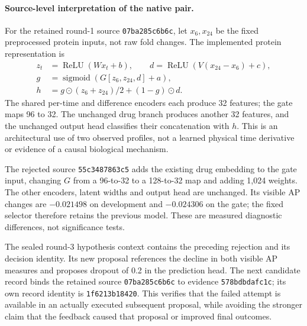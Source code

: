 \paragraph{Source-level interpretation of the native pair.}
For the retained round-1 source \texttt{07ba285c6b6c}, let $x_6,x_{24}$ be
the fixed preprocessed protein inputs, not raw fold changes. The implemented
protein representation is
\[
\begin{aligned}
z_t&=\operatorname{ReLU}(W x_t+b),\qquad
d=\operatorname{ReLU}(V(x_{24}-x_6)+c),\\
g&=\operatorname{sigmoid}(G[z_6,z_{24},d]+a),\\
h&=g\odot(z_6+z_{24})/2+(1-g)\odot d.
\end{aligned}
\]
The shared per-time and difference encoders each produce 32 features;
the gate maps 96 to 32. The unchanged drug branch produces another 32
features, and the unchanged output head classifies their concatenation
with $h$. This is an architectural use of two observed profiles, not a
learned physical time derivative or evidence of a causal biological mechanism.

The rejected source \texttt{55c3487863c5} adds the existing drug embedding
to the gate input, changing $G$ from a 96-to-32 to a 128-to-32 map and
adding 1,024 weights. The other encoders, latent widths and output head
are unchanged. Its visible AP changes are $-0.021498$ on development and
$-0.024306$ on the gate; the fixed selector therefore retains the previous
model. These are measured diagnostic differences, not significance tests.

The sealed round-3 hypothesis context contains the preceding rejection
and its decision identity. Its new proposal references the decline in both
visible AP measures and proposes dropout of 0.2 in the prediction head.
The next candidate record binds the retained source \texttt{07ba285c6b6c}
to evidence \texttt{578bdbdafc1c}; its own record identity is
\texttt{1f6213b18420}. This verifies that the failed attempt is available
in an actually executed subsequent proposal, while avoiding the stronger
claim that the feedback caused that proposal or improved final outcomes.
